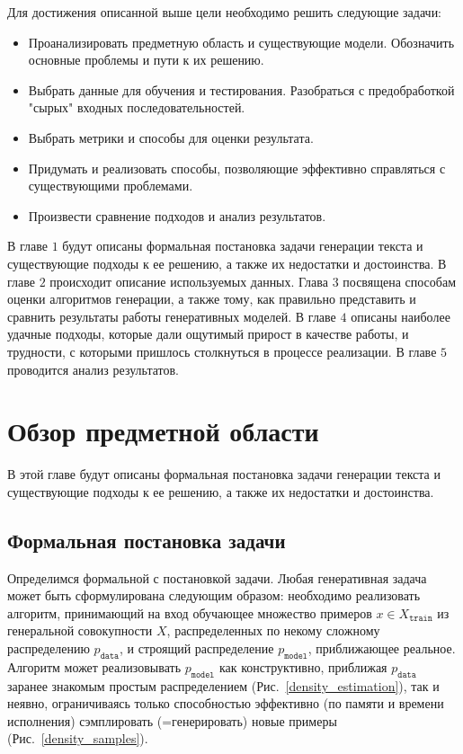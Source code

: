 \documentclass{spbau-diploma}
\begin{document}
Для достижения описанной выше цели необходимо решить следующие задачи:
\begin{itemize}
    \item Проанализировать предметную область и существующие модели. Обозначить основные проблемы и пути к их решению.
    \item Выбрать данные для обучения и тестирования. Разобраться с предобработкой "сырых" входных последовательностей.
    \item Выбрать метрики и способы для оценки результата.
    \item Придумать и реализовать способы, позволяющие эффективно справляться с существующими проблемами.
    \item Произвести сравнение подходов и анализ результатов.
\end{itemize}

В главе $1$ будут описаны формальная постановка задачи генерации текста и 
существующие подходы к ее решению, а также их недостатки и достоинства. В главе
$2$ происходит описание используемых данных. Глава $3$ посвящена способам 
оценки алгоритмов генерации, а также тому, как правильно представить и сравнить 
результаты работы генеративных моделей. В главе $4$ описаны наиболее удачные 
подходы, которые дали ощутимый прирост в качестве работы, и трудности, с 
которыми пришлось столкнуться в процессе реализации. В главе $5$ проводится 
анализ результатов.

\section{Обзор предметной области}
В этой главе будут описаны формальная постановка задачи генерации текста и 
существующие подходы к ее решению, а также их недостатки и достоинства.

\subsection{Формальная постановка задачи}
\newcommand{\Xtrain}{X_{\texttt{train}}}
\newcommand{\pdata}{p_{\texttt{data}}}
\newcommand{\pmodel}{p_{\texttt{model}}}
Определимся формальной с постановкой задачи. Любая генеративная задача может 
быть сформулирована следующим образом: необходимо реализовать алгоритм, 
принимающий на вход обучающее множество примеров $x \in 
\Xtrain$ из генеральной 
совокупности $X$, распределенных по некому сложному распределению $\pdata$, и 
строящий распределение $\pmodel$, приближающее реальное. 
Алгоритм может реализовывать $\pmodel$ как 
конструктивно, приближая $\pdata$ заранее знакомым простым распределением 
(Рис.~\ref{density_estimation}), так и неявно, ограничиваясь 
только способностью эффективно (по памяти и времени исполнения) сэмплировать 
(=генерировать) новые примеры (Рис.~\ref{density_samples}).
\end{document}
